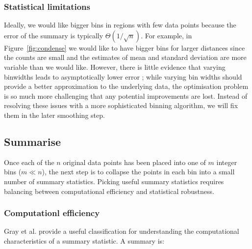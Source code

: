 \documentclass[journal]{vgtc}                %
\begin{document}
\subsubsection{Statistical limitations}

Ideally, we would like bigger bins in regions with few data points because the error of the summary is typically $\Theta(1 / \sqrt{n})$. For example, in Figure~\ref{fig:condense} we would like to have bigger bins for larger distances since the counts are small and the estimates of mean and standard deviation are more variable than we would like. However, there is little evidence that varying binwidths leads to asymptotically lower error \citep{terrell:1992}; while varying bin widths should provide a better approximation to the underlying data, the optimisation problem is so much more challenging that any potential improvements are lost. Instead of resolving these issues with a more sophisticated binning algorithm, we will fix them in the later smoothing step.  



\subsection{Summarise}
\label{sub:summarise}

Once each of the $n$ original data points has been placed into one of $m$ integer bins ($m \ll n$), the next step is to collapse the points in each bin into a small number of summary statistics. Picking useful summary statistics requires balancing between computational efficiency and statistical robustness. 

\subsubsection{Computationl efficiency}

Gray et al. \citep{gray:1997} provide a useful classification for understanding the computational characteristics of a summary statistic. A summary is:
\end{document}
